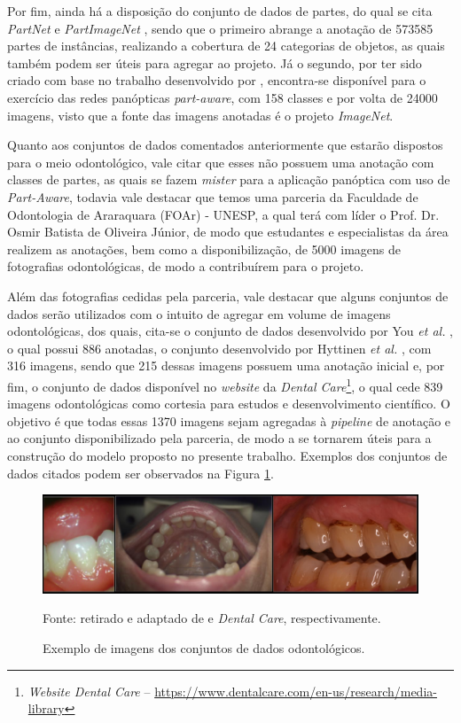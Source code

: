 Por fim, ainda há a disposição do conjunto de dados de partes, do qual se cita \textit{PartNet} \cite{mo2019} e \textit{PartImageNet} \cite{He2021}, sendo que o primeiro abrange a anotação de 573585 partes de instâncias, realizando a cobertura de 24 categorias de objetos, as quais também podem ser úteis para agregar ao projeto. Já o segundo, por ter sido criado com base no trabalho desenvolvido por \cite{DeGeus2021}, encontra-se disponível para o exercício das redes panópticas \textit{part-aware}, com 158 classes e por volta de 24000 imagens, visto que a fonte das imagens anotadas é o projeto \textit{ImageNet}.

Quanto aos conjuntos de dados comentados anteriormente que estarão dispostos para o meio odontológico, vale citar que esses não possuem uma anotação com classes de partes, as quais se fazem \textit{mister} para a aplicação panóptica com uso de \textit{Part-Aware}, todavia vale destacar que temos uma parceria da Faculdade de Odontologia de Araraquara (FOAr) - UNESP, a qual terá com líder o Prof. Dr. Osmir Batista de Oliveira Júnior, de modo que estudantes e especialistas da área realizem as anotações, bem como a disponibilização, de 5000 imagens de fotografias odontológicas, de modo a contribuírem para o projeto.

Além das fotografias cedidas pela parceria, vale destacar que alguns conjuntos de dados serão utilizados com o intuito de agregar em volume de imagens odontológicas, dos quais, cita-se o conjunto de dados desenvolvido por You \textit{et al.} \cite{You2020}, o qual possui 886 anotadas, o conjunto desenvolvido por Hyttinen \textit{et al.} \cite{Hyttinen2020}, com 316 imagens, sendo que 215 dessas imagens possuem uma anotação inicial e, por fim, o conjunto de dados disponível no \textit{website} da \textit{Dental Care}\footnote{\textit{Website \textit{Dental Care}} – \url{https://www.dentalcare.com/en-us/research/media-library}}, o qual cede 839 imagens odontológicas como cortesia para estudos e desenvolvimento científico. O objetivo é que todas essas 1370 imagens sejam agregadas à \textit{pipeline} de anotação e ao conjunto disponibilizado pela parceria, de modo a se tornarem úteis para a construção do modelo proposto no presente trabalho. Exemplos dos conjuntos de dados citados podem ser observados na Figura \ref{proposal:dataset:fig:2}.

\begin{figure}[H]
    \centering
    \caption{Exemplo de imagens dos conjuntos de dados odontológicos.}
    \includegraphics[width=1\textwidth]{recursos/imagens/proposal/image_odonto_dataset.png}
    \label{proposal:dataset:fig:2}

    Fonte: retirado e adaptado de \cite{You2020, Hyttinen2020} e \textit{Dental Care}, respectivamente.
\end{figure}



